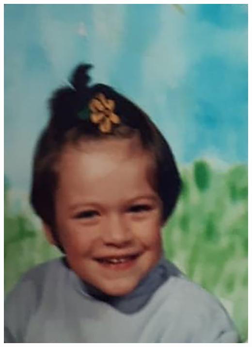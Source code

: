 \begin{questions}
{\begin{center}
{\includegraphics[scale=0.08]{lisa}}
\end{center}
\begin{flushleft}
\end{flushleft} }
\question[1] {
\begin{center}

\end{center}}
\end{questions}
